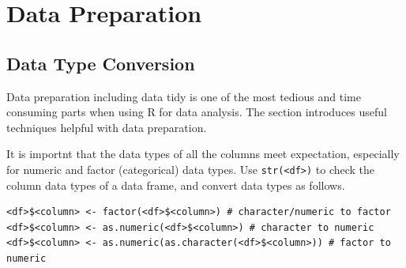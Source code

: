 \section{Data Preparation} \label{ch:r1:sec:datapreparation}

\subsection{Data Type Conversion}

Data preparation including data tidy is one of the most tedious and time consuming parts when using R for data analysis. The section introduces useful techniques helpful with data preparation.

It is importnt that the data types of all the columns meet expectation, especially for numeric and factor (categorical) data types. Use \verb|str(<df>)| to check the column data types of a data frame, and convert data types as follows.
\begin{lstlisting}
<df>$<column> <- factor(<df>$<column>) # character/numeric to factor
<df>$<column> <- as.numeric(<df>$<column>) # character to numeric
<df>$<column> <- as.numeric(as.character(<df>$<column>)) # factor to numeric
\end{lstlisting}

